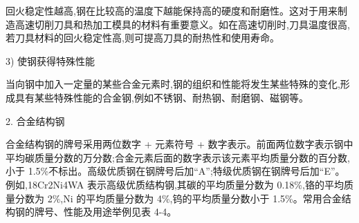 \documentclass[UTF8]{ctexbook}
\newcommand{\◎}{\ensuremath{\bigcirc}}
\begin{document}
回火稳定性越高,钢在比较高的温度下越能保持高的硬度和耐磨性。这对于用来制造高速切削刀具和热加工模具的材料有重要意义。如在高速切削时,刀具温度很高,若刀具材料的回火稳定性高,则可提高刀具的耐热性和使用寿命。

3) 使钢获得特殊性能

当向钢中加入一定量的某些合金元素时,钢的组织和性能将发生某些特殊的变化,形成具有某些特殊性能的合金钢,例如不锈钢、耐热钢、耐磨钢、磁钢等。

2. 合金结构钢

合金结构钢的牌号采用两位数字 + 元素符号 + 数字表示。前面两位数字表示钢中平均碳质量分数的万分数;合金元素后面的数字表示该元素平均质量分数的百分数,小于 1.5\%不标出。高级优质钢在钢牌号后加“A”;特级优质钢在钢牌号后加“E”。例如,18Cr2Ni4WA 表示高级优质结构钢,其碳的平均质量分数为 0.18\%,铬的平均质量分数为 2\%,Ni 的平均质量分数为 4\%,钨的平均质量分数小于 1.5\%。常用合金结构钢的牌号、性能及用途举例见表 4-4。
\end{document}
